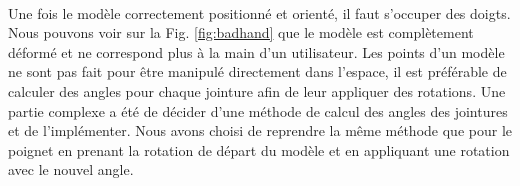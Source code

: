 \paragraph{} 
Une fois le modèle correctement positionné et orienté, il faut s'occuper des doigts.
Nous pouvons voir sur la Fig. \ref{fig:badhand} que le modèle est complètement déformé et ne correspond plus à la main d'un utilisateur. Les points d'un modèle ne sont pas fait pour être manipulé directement dans l'espace, il est préférable de calculer des angles pour chaque jointure afin de leur appliquer 
des rotations. Une partie complexe a été de décider d'une méthode de calcul des angles des jointures et de l'implémenter.
Nous avons choisi de reprendre la même méthode que pour le poignet en prenant la rotation de départ du modèle et en appliquant une rotation avec le nouvel angle.



